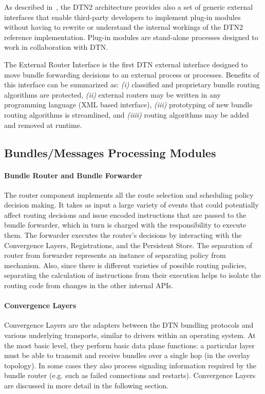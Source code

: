 As described in~\cite{Demmer03implementingdelay, DTN2Manual}, the DTN2 architecture provides also a set of generic external interfaces that enable third-party developers to implement plug-in modules without having to rewrite or understand the internal workings of the DTN2 reference implementation. Plug-in modules are stand-alone processes designed to work in collaboration with DTN.

The External Router Interface is the first DTN external interface designed to move bundle forwarding decisions to an external process or processes. Benefits of this interface can be summarized as: \emph{(i)} classified and proprietary bundle routing algorithms are protected, \emph{(ii)} external routers may be written in any programming language (XML based interface), \emph{(iii)} prototyping of new bundle routing algorithms is streamlined, and \emph{(iiii)} routing algorithms may be added and removed at runtime.

\subsection{Bundles/Messages Processing Modules}

\paragraph{Bundle Router and Bundle Forwarder}
 
The router component implements all the route selection and scheduling policy decision making. It takes as input a large variety of events that could potentially affect routing decisions and issue encoded instructions that are passed to the bundle forwarder, which in turn is charged with the responsibility to execute them. The forwarder executes the router's decisions by interacting with the Convergence Layers, Registrations, and the Persistent Store. The separation of router from forwarder represents an instance of separating policy from mechanism. Also, since there is different varieties of possible routing policies, separating the calculation of instructions from their execution helps to isolate the routing code from changes in the other internal APIs.

\paragraph{Convergence Layers}
Convergence Layers are the adapters between the DTN bundling protocols and various underlying transports,
similar to drivers within an operating system. At the most basic level, they perform basic data plane functions: a
particular layer must be able to transmit and receive bundles over a single hop (in the overlay topology). In some
cases they also process signaling information required by the bundle router (e.g. such as failed connections and
restarts). Convergence Layers are discussed in more detail in the following section.

